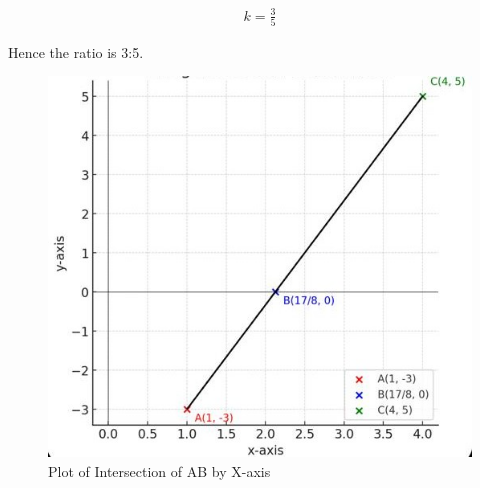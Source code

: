 \documentclass[journal,12pt,onecolumn]{IEEEtran}
\theoremstyle{remark}
\begin{document}
\begin{align}
    k = \frac{3}{5}
\end{align}

\centering
\begin{large}Hence the ratio is 3:5.\end{large}

\begin{figure}[H]
\centering
\includegraphics[width=0.8\columnwidth]{figs/graph.png}
 \caption*{Plot of Intersection of AB by X-axis}
\label{fig:graph.png}
\end{figure}
\end{document}

